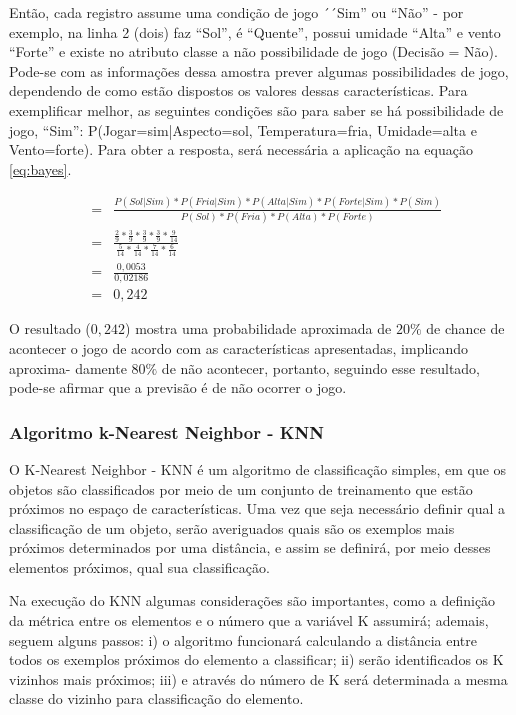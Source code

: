 Então, cada registro assume uma condição de jogo ´´Sim'' ou ``Não'' - por exemplo, na linha 2 (dois) faz ``Sol'', é ``Quente'', possui umidade ``Alta'' e vento ``Forte'' e existe no atributo classe a não possibilidade de jogo (Decisão = Não). Pode-se com as informações dessa amostra prever algumas possibilidades de jogo, dependendo de como estão dispostos os valores dessas características. Para exemplificar melhor, as seguintes condições são para saber se há possibilidade de jogo, ``Sim'': P(Jogar=sim|Aspecto=sol, Temperatura=fria, Umidade=alta e Vento=forte). Para obter a resposta, será necessária a aplicação na equação \ref{eq:bayes}.

 


\begin{eqnarray}
&=& \frac{ P(Sol|Sim)*P(Fria|Sim)*P(Alta|Sim)*P(Forte|Sim)*P(Sim) }{ P(Sol)*P(Fria)*P(Alta)*P(Forte) } \nonumber \\
 &=& \frac{ \frac{2}{9}*\frac{3}{9}*\frac{3}{9}*\frac{3}{9}*\frac{9}{14} }{ \frac{5}{14}*\frac{4}{14}*\frac{7}{14}*\frac{6}{14} } \nonumber \\
 &=& \frac{0,0053}{0,02186} \nonumber \\
 &=& 0,242
 \label{eq:resolNB}
\end{eqnarray}

O resultado (${0,242}$) mostra uma probabilidade aproximada de ${20\%}$ de chance de acontecer o jogo de acordo com as características apresentadas, implicando aproxima- damente ${80\%}$ de não acontecer, portanto, seguindo esse resultado, pode-se afirmar que a previsão é de não ocorrer o jogo. 


\subsubsection{Algoritmo k-Nearest Neighbor - KNN}\label{cap:refTeor:sssec:knn}

O K-Nearest Neighbor - KNN é um algoritmo de classificação simples, em que os objetos são classificados por meio de um conjunto de treinamento que estão próximos no espaço de características. Uma vez que seja necessário definir qual a classificação de um objeto, serão averiguados quais são os exemplos mais próximos determinados por uma distância, e assim se definirá, por meio desses elementos próximos, qual sua classificação. 

Na execução do KNN algumas considerações são importantes, como a definição da métrica entre os elementos e o número que a variável K assumirá; ademais, seguem alguns passos: i) o algoritmo funcionará calculando a distância entre todos os exemplos próximos do elemento a classificar; ii) serão identificados os K vizinhos mais próximos; iii) e através do número de K será determinada a mesma classe do vizinho para classificação do elemento. 

